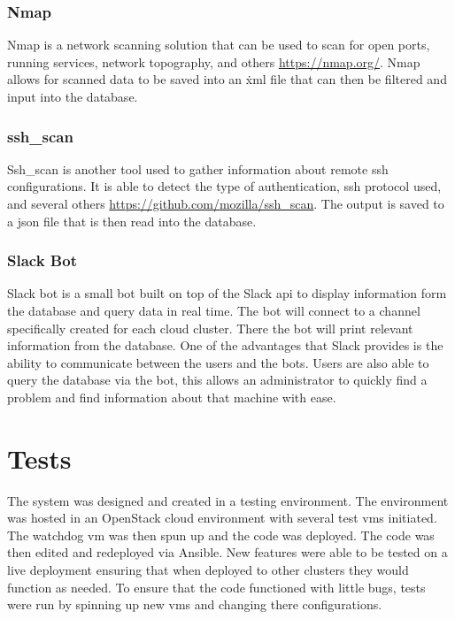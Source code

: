 \documentclass[12pt]{article}
\begin{document}
\subsubsection{Nmap}
Nmap is a network scanning solution that can be used to scan for open ports, running services, network topography, and others \href{https://nmap.org/}{https://nmap.org/}. Nmap allows for scanned data to be saved into an \.xml file that can then be filtered and input into the database.

\subsubsection{ssh\_scan}
Ssh\_scan is another tool used to gather information about remote ssh configurations. It is able to detect the type of authentication, ssh protocol used, and several others \href{https://github.com/mozilla/ssh\_scan}{https://github.com/mozilla/ssh\_scan}. The output is saved to a json file that is then read into the database.

\subsubsection{Slack Bot}
Slack bot is a small bot built on top of the Slack api to display information form the database and query data in real time. The bot will connect to a channel specifically created for each cloud cluster. There the bot will print relevant information from the database. One of the advantages that Slack provides is the ability to communicate between the users and the bots. Users are also able to query the database via the bot, this allows an administrator to quickly find a problem and find information about that machine with ease.


\section{Tests}
The system was designed and created in a testing environment. The environment was hosted in an OpenStack cloud environment with several test vms initiated. The watchdog vm was then spun up and the code was deployed. The code was then edited and redeployed via Ansible. New features were able to be tested on a live deployment ensuring that when deployed to other clusters they would function as needed. To ensure that the code functioned with little bugs, tests were run by spinning up new vms and changing there configurations.
\end{document}
